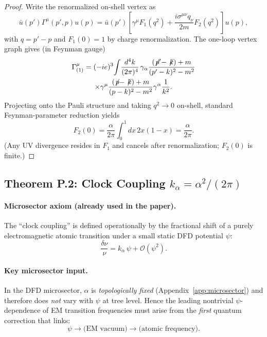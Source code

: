 \begin{proof}
Write the renormalized on-shell vertex as
\begin{equation}
\bar u(p')\Gamma^\mu(p',p)u(p)=\bar u(p')\!\left[\gamma^\mu F_1(q^2) + \frac{i\sigma^{\mu\nu}q_\nu}{2m}F_2(q^2)\right]\!u(p),
\end{equation}
with $q=p'-p$ and $F_1(0)=1$ by charge renormalization. The one-loop vertex graph gives (in Feynman gauge)
\begin{multline}
\Gamma^\mu_{(1)} = (-ie)^3\!\int\!\frac{d^4k}{(2\pi)^4}\,
\gamma_\alpha\frac{(\not\!p'-\not\!k)+m}{(p'-k)^2-m^2} \\
\times\gamma^\mu
\frac{(\not\!p-\not\!k)+m}{(p-k)^2-m^2}\gamma^\alpha\frac{1}{k^2}.
\end{multline}
Projecting onto the Pauli structure and taking $q^2\to 0$ on-shell, standard Feynman-parameter reduction yields
\begin{equation}
F_2(0) = \frac{\alpha}{2\pi}\int_0^1\! dx\,2x(1-x)=\frac{\alpha}{2\pi}.
\end{equation}
(Any UV divergence resides in $F_1$ and cancels after renormalization; $F_2(0)$ is finite.)
\end{proof}

\subsection{Theorem P.2: Clock Coupling $k_\alpha=\alpha^2/(2\pi)$}\label{sec:P_kalpha}

\paragraph{Microsector axiom (already used in the paper).}
The ``clock coupling'' is defined operationally by the fractional shift of a purely electromagnetic 
atomic transition under a small static DFD potential $\psi$:
\begin{equation}\label{eq:P_def_kalpha}
\frac{\delta \nu}{\nu} = k_\alpha\,\psi + \mathcal{O}(\psi^2).
\end{equation}

\paragraph{Key microsector input.}
In the DFD microsector, $\alpha$ is \emph{topologically fixed} (Appendix~\ref{app:microsector}) and therefore 
does \emph{not} vary with $\psi$ at tree level.
Hence the leading nontrivial $\psi$-dependence of EM transition frequencies must arise from the 
\emph{first} quantum correction that links:
\begin{equation}
\psi \longrightarrow \text{(EM vacuum)} \longrightarrow \text{(atomic frequency)}.
\end{equation}

